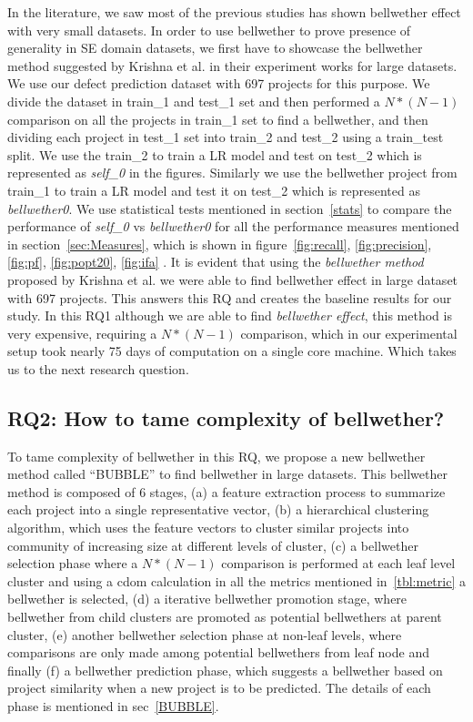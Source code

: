 \documentclass[sigconf]{acmart}
\theoremstyle{break}
\begin{document}
In the literature, we saw most of the previous studies has shown bellwether effect with very small datasets. In order to use bellwether to prove presence of generality in SE domain datasets, we first have to showcase the bellwether method suggested by Krishna et al. in their experiment works for large datasets. We use our defect prediction dataset with 697 projects for this purpose. We divide the dataset in train\_1 and test\_1 set and then performed a $ N*(N-1) $ comparison on all the projects in train\_1 set to find a bellwether, and then dividing each project in test\_1 set into train\_2 and test\_2 using a train\_test split. We use the train\_2 to train a LR model and test on test\_2 which is represented as \textit{self\_0} in the figures. Similarly we use the bellwether project from train\_1 to train a LR model and test it on test\_2 which is represented as \textit{bellwether0}. We use statistical tests mentioned in section~\ref{stats} to compare the performance of \textit{self\_0} vs \textit{bellwether0} for all the performance measures mentioned in section~\ref{sec:Measures}, which is shown in figure~\ref{fig:recall}, \ref{fig:precision}, \ref{fig:pf}, \ref{fig:popt20}, \ref{fig:ifa} . It is evident that using the \textit{bellwether method} proposed by Krishna et al. we were able to find bellwether effect in large dataset with 697 projects. This answers this RQ and creates the baseline results for our study. In this RQ1 although we are able to find \textit{bellwether effect}, this method is very expensive, requiring a $ N*(N-1) $ comparison, which in our experimental setup took nearly 75 days of computation on a single core machine. Which takes us to the next research question. 



\subsection{RQ2: How to tame complexity of bellwether?}
\label{sec:rq2}

To tame complexity of bellwether in this RQ, we propose a new bellwether method called ``BUBBLE'' to find bellwether in large datasets. This bellwether method is composed of 6 stages, (a) a feature extraction process to summarize each project into a single representative vector, (b) a hierarchical clustering algorithm, which uses the feature vectors to cluster similar projects into community of increasing size at different levels of cluster, (c) a bellwether selection phase where a $N*(N-1)$ comparison is performed at each leaf level cluster and using a cdom calculation in all the metrics mentioned in~\ref{tbl:metric} a bellwether is selected, (d) a iterative bellwether promotion stage, where bellwether from child clusters are promoted as potential bellwethers at parent cluster, (e) another bellwether selection phase at non-leaf levels, where comparisons are only made among potential bellwethers from leaf node and finally (f) a bellwether prediction phase, which suggests a bellwether based on project similarity when a new project is to be predicted. The details of each phase is mentioned in sec~\ref{BUBBLE}. 
\end{document}
